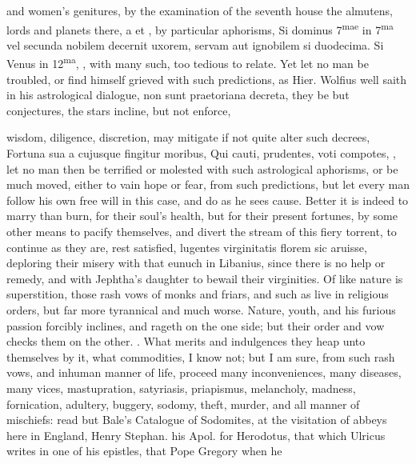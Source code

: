 {and women's genitures, by the examination of the seventh house the
almutens, lords and planets there, a \leftmoon{} et \astrosun{} \etc{}, by particular
aphorisms, Si dominus 7\textsuperscript{mae} in 7\textsuperscript{ma} vel secunda nobilem decernit uxorem,
servam aut ignobilem si duodecima. Si Venus in 12\textsuperscript{ma}, \etc{}, with many
such, too tedious to relate. Yet let no man be troubled, or find
himself grieved with such predictions, as Hier. Wolfius well saith in
his astrological dialogue, non sunt praetoriana decreta, they be
but conjectures, the stars incline, but not enforce,

wisdom, diligence, discretion, may mitigate if not quite alter such
decrees, Fortuna sua a cujusque fingitur moribus, Qui cauti,
prudentes, voti compotes, \etc{}, let no man then be terrified or molested
with such astrological aphorisms, or be much moved, either to vain hope
or fear, from such predictions, but let every man follow his own free
will in this case, and do as he sees cause. Better it is indeed to
marry than burn, for their soul's health, but for their present
fortunes, by some other means to pacify themselves, and divert the
stream of this fiery torrent, to continue as they are, rest
satisfied, lugentes virginitatis florem sic aruisse, deploring their
misery with that eunuch in Libanius, since there is no help or remedy,
and with Jephtha's daughter to bewail their virginities.
Of like nature is superstition, those rash vows of monks and friars,
and such as live in religious orders, but far more tyrannical and much
worse. Nature, youth, and his furious passion forcibly inclines, and
rageth on the one side; but their order and vow checks them on the
other. . What merits and
indulgences they heap unto themselves by it, what commodities, I know
not; but I am sure, from such rash vows, and inhuman manner of life,
proceed many inconveniences, many diseases, many vices, mastupration,
satyriasis, priapismus, melancholy, madness, fornication,
adultery, buggery, sodomy, theft, murder, and all manner of mischiefs:
read but Bale's Catalogue of Sodomites, at the visitation of abbeys
here in England, Henry Stephan. his Apol. for Herodotus, that which
Ulricus writes in one of his epistles, that Pope Gregory when he
}
